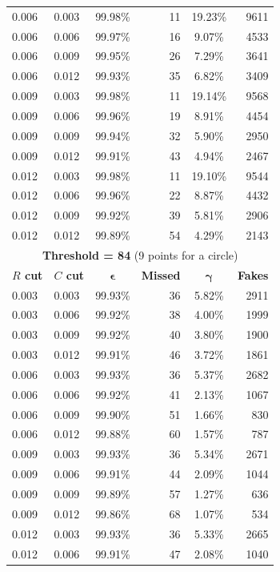 \documentclass[11pt,twoside]{scrreprt}
\begin{document}
\begin{longtable}{llcrcr}
0.006 & 0.003 & 99.98\% & 11 & 19.23\% & 9611 \\
0.006 & 0.006 & 99.97\% & 16 & 9.07\% & 4533 \\
0.006 & 0.009 & 99.95\% & 26 & 7.29\% & 3641 \\
0.006 & 0.012 & 99.93\% & 35 & 6.82\% & 3409 \\
0.009 & 0.003 & 99.98\% & 11 & 19.14\% & 9568 \\
0.009 & 0.006 & 99.96\% & 19 & 8.91\% & 4454 \\
0.009 & 0.009 & 99.94\% & 32 & 5.90\% & 2950 \\
0.009 & 0.012 & 99.91\% & 43 & 4.94\% & 2467 \\
0.012 & 0.003 & 99.98\% & 11 & 19.10\% & 9544 \\
0.012 & 0.006 & 99.96\% & 22 & 8.87\% & 4432 \\
0.012 & 0.009 & 99.92\% & 39 & 5.81\% & 2906 \\
0.012 & 0.012 & 99.89\% & 54 & 4.29\% & 2143 \\
\bottomrule
\toprule
\multicolumn{6}{c}{\textbf{Threshold = 84} (9 points for a circle)}\\
\midrule
\textbf{$R$ cut} & \textbf{$C$ cut} & $\boldsymbol{\epsilon}$ & \textbf{Missed} & $\boldsymbol{\gamma}$ & \textbf{Fakes} \\
\midrule
0.003 & 0.003 & 99.93\% & 36 & 5.82\% & 2911 \\
0.003 & 0.006 & 99.92\% & 38 & 4.00\% & 1999 \\
0.003 & 0.009 & 99.92\% & 40 & 3.80\% & 1900 \\
0.003 & 0.012 & 99.91\% & 46 & 3.72\% & 1861 \\
0.006 & 0.003 & 99.93\% & 36 & 5.37\% & 2682 \\
0.006 & 0.006 & 99.92\% & 41 & 2.13\% & 1067 \\
0.006 & 0.009 & 99.90\% & 51 & 1.66\% & 830 \\
0.006 & 0.012 & 99.88\% & 60 & 1.57\% & 787 \\
0.009 & 0.003 & 99.93\% & 36 & 5.34\% & 2671 \\
0.009 & 0.006 & 99.91\% & 44 & 2.09\% & 1044 \\
0.009 & 0.009 & 99.89\% & 57 & 1.27\% & 636 \\
0.009 & 0.012 & 99.86\% & 68 & 1.07\% & 534 \\
0.012 & 0.003 & 99.93\% & 36 & 5.33\% & 2665 \\
0.012 & 0.006 & 99.91\% & 47 & 2.08\% & 1040 \\

\end{longtable}
\end{document}

